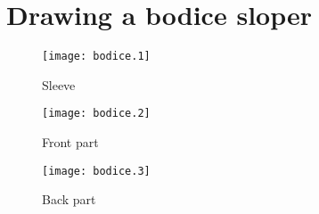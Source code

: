 \documentclass{article}
\begin{document}
\section*{Drawing a bodice sloper}

\begin{figure}[htb]
\begin{center}
\texttt{[image: bodice.1]}
\caption{Sleeve}
\end{center}
\end{figure}

\begin{figure}[htb]
\begin{center}
\texttt{[image: bodice.2]}
\caption{Front part}
\end{center}
\end{figure}

\begin{figure}[htb]
\begin{center}
\texttt{[image: bodice.3]}
\caption{Back part}
\end{center}
\end{figure}
\end{document}
